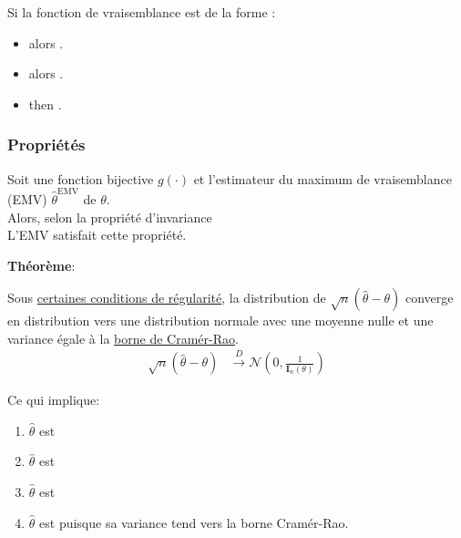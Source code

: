 \documentclass[10pt, french]{article}
\begin{document}
\begin{multicols*}{2}
Si la fonction de vraisemblance est de la forme :
\begin{itemize}
	\item	{} alors .
	\item	{} alors .
	\item	{} then .
\end{itemize}


\subsubsection{Propriétés}
\begin{definitionNOHFILL}
Soit une fonction bijective $g(\cdot)$ et l'estimateur du maximum de vraisemblance (EMV) $\hat{\theta}^{\text{EMV}}$ de $\theta$.\\
Alors, selon la propriété d'invariance \\

L'EMV satisfait cette propriété.
\end{definitionNOHFILL}

\begin{definitionNOHFILL}
\textbf{Théorème}:	

\tcbline

Sous \hyperlink{reg_cond}{\color{blue!40!green!80!black}certaines conditions de régularité}, la distribution de $\sqrt{n}\left( \hat{\theta}	-	\theta \right)$ converge en distribution vers une distribution normale avec une moyenne nulle et une variance égale à la \hyperref[sec:cramer_rao]{\color{azure(colorwheel)}borne de Cramér-Rao}.
\begin{align*}
	\sqrt{n}\left( \hat{\theta}	-	\theta \right)
	&\overset{D}{\rightarrow}
	\mathcal{N}\left( 0, \frac{1}{\bm{I}_{n}(\theta)} \right)
\end{align*}

Ce qui implique:
\begin{enumerate}
	\item	$\hat{\theta}$ est 
	\item	$\hat{\theta}$ est 
	\item	$\hat{\theta}$ est  
	\item	$\hat{\theta}$ est  puisque sa variance tend vers la borne Cramér-Rao.
\end{enumerate}
\end{definitionNOHFILL}
	

\end{multicols*}
\end{document}
